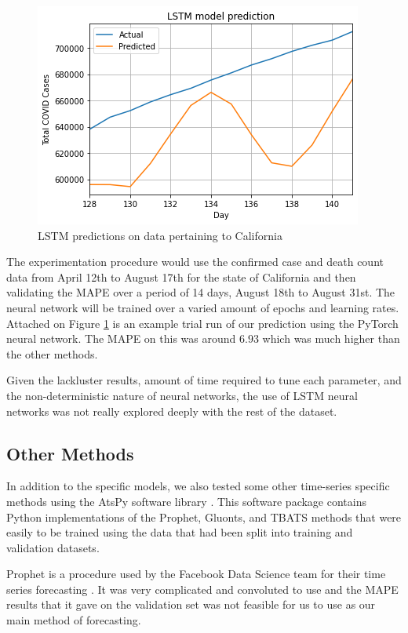 \documentclass[sigconf,nonacm]{acmart}
\begin{document}
\begin{figure}
  \centering
  \includegraphics[width=\linewidth]{figures/LSTMPytorch.png}
  \caption{LSTM predictions on data pertaining to California}
  \label{fig:LSTM_trial}
\end{figure} 

The experimentation procedure would use the confirmed case and death count data
from April 12th to August 17th for the state of California and then validating
the MAPE over a period of 14 days, August 18th to August 31st. The neural
network will be trained over a varied amount of epochs and learning rates. 
Attached on Figure  \ref{fig:LSTM_trial} is an example trial run of our
prediction using the PyTorch neural network. The MAPE on this was around $6.93$
which was much higher than the other methods.

Given the lackluster results, amount of time required to tune each parameter,
and the non-deterministic nature of neural networks, the use of LSTM neural
networks was not really explored deeply with the rest of the dataset.

\subsection{Other Methods}

In addition to the specific models, we also tested some other time-series
specific methods using the AtsPy software library \cite{atspy}. This software
package contains Python implementations of the Prophet, Gluonts, and TBATS methods 
that were easily to be trained using the data that had been split into training
and validation datasets.

Prophet is a procedure used by the Facebook Data Science team for their time 
series forecasting \cite{Prophet}. It was very complicated and convoluted to 
use and the MAPE results that it gave on the validation set was not feasible 
for us to use as our main method of forecasting.
\end{document}
